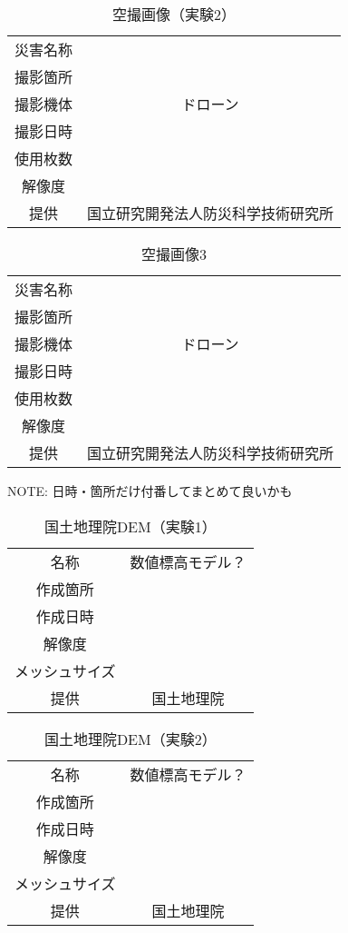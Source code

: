     \begin{table}[b]
      \centering
      \caption{空撮画像（実験2）}
      \label{空撮画像2}
      \begin{tabular}{cc}
        \hline
        災害名称 &  \\
        撮影箇所 &  \\
        撮影機体 & ドローン \\
        撮影日時 &  \\
        使用枚数 & \\
        解像度 &  \\
        提供 & 国立研究開発法人防災科学技術研究所 \\ \hline
      \end{tabular}
    \end{table}

    
    \begin{table}[b]
      \centering
      \caption{空撮画像3}
      \label{空撮画像3}
      \begin{tabular}{cc}
        \hline
        災害名称 &  \\
        撮影箇所 &  \\
        撮影機体 & ドローン \\
        撮影日時 &  \\
        使用枚数 & \\
        解像度 &  \\
        提供 & 国立研究開発法人防災科学技術研究所 \\ \hline
      \end{tabular}
    \end{table}

    NOTE: 日時・箇所だけ付番してまとめて良いかも
    \begin{table}[b]
      \centering
      \caption{国土地理院DEM（実験1）}
      \label{国土地理院DEM1}
      \begin{tabular}{cc}
        \hline
        名称 & 数値標高モデル？ \\
        作成箇所 &  \\
        作成日時 &  \\
        解像度 & \\
        メッシュサイズ &  \\
        提供 & 国土地理院 \\ \hline
      \end{tabular}
    \end{table}

    \begin{table}[b]
      \centering
      \caption{国土地理院DEM（実験2）}
      \label{国土地理院DEM2}
      \begin{tabular}{cc}
        \hline
        名称 & 数値標高モデル？ \\
        作成箇所 &  \\
        作成日時 &  \\
        解像度 & \\
        メッシュサイズ &  \\
        提供 & 国土地理院 \\ \hline
      \end{tabular}
    \end{table}

